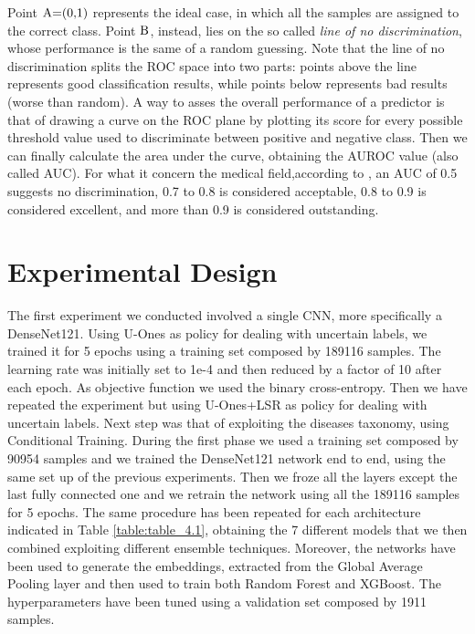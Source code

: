 \newpage
Point $\textup{A=(0,1)}$ represents the ideal case, in which all the samples are assigned to the correct class. Point $\textup{B}$, instead, lies on the so called \textit{line of no discrimination}, whose performance is the same of a random guessing. Note that the line of no discrimination splits the ROC space into two parts: points above the line represents good classification results, while points below represents bad results (worse than random).
A way to asses the overall performance of a predictor is that of drawing a curve on the ROC plane by plotting its score for every possible threshold value used to discriminate between positive and negative class. Then we can finally calculate the area under the curve, obtaining the \ac{AUROC} value (also called AUC). For what it concern the medical field,according to \cite{auroc}, an AUC of 0.5 suggests no discrimination, 0.7 to 0.8 is considered acceptable, 0.8 to 0.9 is considered excellent, and more than 0.9 is considered outstanding.

\vspace{5mm}
\section{Experimental Design}
\label{sec:experimental_design}
The first experiment we conducted involved a single CNN, more specifically a DenseNet121. Using U-Ones as policy for dealing with uncertain labels, we trained it for 5 epochs using a training set composed by 189116 samples. The learning rate was initially set to 1e-4 and then reduced by a factor of 10 after each epoch. As objective function we used the binary cross-entropy. Then we have repeated the experiment but using U-Ones+LSR as policy for dealing with uncertain labels.
\noindent Next step was that of exploiting the diseases taxonomy, using Conditional Training. During the first phase we used a training set composed by 90954 samples and we trained the DenseNet121 network end to end, using the same set up of the previous experiments. Then we froze all the layers except the last fully connected one and we retrain the network using all the 189116 samples for 5 epochs. The same procedure has been repeated for each architecture indicated in Table \ref{table:table_4.1}, obtaining the 7 different models that we then combined exploiting different ensemble techniques.
Moreover, the networks have been used to generate the embeddings, extracted from the Global Average Pooling layer and then used to train both Random Forest and XGBoost. The hyperparameters have been tuned using a validation set composed by 1911 samples. 


